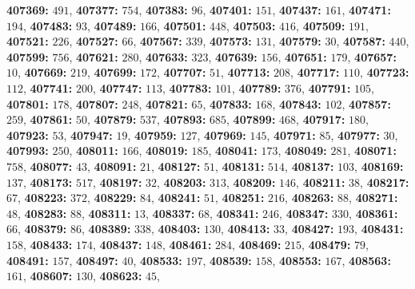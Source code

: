 \textsf{\bfseries 407369:} $491$, \textsf{\bfseries 407377:} $754$, \textsf{\bfseries 407383:} $96$, \textsf{\bfseries 407401:} $151$, \textsf{\bfseries 407437:} $161$, \textsf{\bfseries 407471:} $194$, \textsf{\bfseries 407483:} $93$, \textsf{\bfseries 407489:} $166$, \textsf{\bfseries 407501:} $448$, \textsf{\bfseries 407503:} $416$, \textsf{\bfseries 407509:} $191$, \textsf{\bfseries 407521:} $226$, \textsf{\bfseries 407527:} $66$, \textsf{\bfseries 407567:} $339$, \textsf{\bfseries 407573:} $131$, \textsf{\bfseries 407579:} $30$, \textsf{\bfseries 407587:} $440$, \textsf{\bfseries 407599:} $756$, \textsf{\bfseries 407621:} $280$, \textsf{\bfseries 407633:} $323$, \textsf{\bfseries 407639:} $156$, \textsf{\bfseries 407651:} $179$, \textsf{\bfseries 407657:} $10$, \textsf{\bfseries 407669:} $219$, \textsf{\bfseries 407699:} $172$, \textsf{\bfseries 407707:} $51$, \textsf{\bfseries 407713:} $208$, \textsf{\bfseries 407717:} $110$, \textsf{\bfseries 407723:} $112$, \textsf{\bfseries 407741:} $200$, \textsf{\bfseries 407747:} $113$, \textsf{\bfseries 407783:} $101$, \textsf{\bfseries 407789:} $376$, \textsf{\bfseries 407791:} $105$, \textsf{\bfseries 407801:} $178$, \textsf{\bfseries 407807:} $248$, \textsf{\bfseries 407821:} $65$, \textsf{\bfseries 407833:} $168$, \textsf{\bfseries 407843:} $102$, \textsf{\bfseries 407857:} $259$, \textsf{\bfseries 407861:} $50$, \textsf{\bfseries 407879:} $537$, \textsf{\bfseries 407893:} $685$, \textsf{\bfseries 407899:} $468$, \textsf{\bfseries 407917:} $180$, \textsf{\bfseries 407923:} $53$, \textsf{\bfseries 407947:} $19$, \textsf{\bfseries 407959:} $127$, \textsf{\bfseries 407969:} $145$, \textsf{\bfseries 407971:} $85$, \textsf{\bfseries 407977:} $30$, \textsf{\bfseries 407993:} $250$, \textsf{\bfseries 408011:} $166$, \textsf{\bfseries 408019:} $185$, \textsf{\bfseries 408041:} $173$, \textsf{\bfseries 408049:} $281$, \textsf{\bfseries 408071:} $758$, \textsf{\bfseries 408077:} $43$, \textsf{\bfseries 408091:} $21$, \textsf{\bfseries 408127:} $51$, \textsf{\bfseries 408131:} $514$, \textsf{\bfseries 408137:} $103$, \textsf{\bfseries 408169:} $137$, \textsf{\bfseries 408173:} $517$, \textsf{\bfseries 408197:} $32$, \textsf{\bfseries 408203:} $313$, \textsf{\bfseries 408209:} $146$, \textsf{\bfseries 408211:} $38$, \textsf{\bfseries 408217:} $67$, \textsf{\bfseries 408223:} $372$, \textsf{\bfseries 408229:} $84$, \textsf{\bfseries 408241:} $51$, \textsf{\bfseries 408251:} $216$, \textsf{\bfseries 408263:} $88$, \textsf{\bfseries 408271:} $48$, \textsf{\bfseries 408283:} $88$, \textsf{\bfseries 408311:} $13$, \textsf{\bfseries 408337:} $68$, \textsf{\bfseries 408341:} $246$, \textsf{\bfseries 408347:} $330$, \textsf{\bfseries 408361:} $66$, \textsf{\bfseries 408379:} $86$, \textsf{\bfseries 408389:} $338$, \textsf{\bfseries 408403:} $130$, \textsf{\bfseries 408413:} $33$, \textsf{\bfseries 408427:} $193$, \textsf{\bfseries 408431:} $158$, \textsf{\bfseries 408433:} $174$, \textsf{\bfseries 408437:} $148$, \textsf{\bfseries 408461:} $284$, \textsf{\bfseries 408469:} $215$, \textsf{\bfseries 408479:} $79$, \textsf{\bfseries 408491:} $157$, \textsf{\bfseries 408497:} $40$, \textsf{\bfseries 408533:} $197$, \textsf{\bfseries 408539:} $158$, \textsf{\bfseries 408553:} $167$, \textsf{\bfseries 408563:} $161$, \textsf{\bfseries 408607:} $130$, \textsf{\bfseries 408623:} $45$, 
